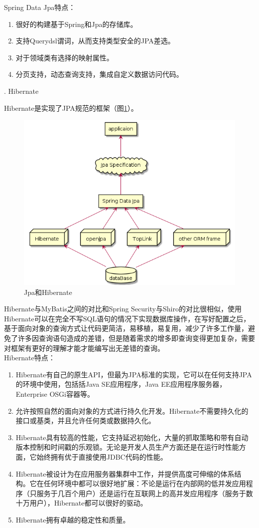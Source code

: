 Spring Data Jpa特点：
\begin{enumerate}
  \item 很好的构建基于Spring和Jpa的存储库。
  \item 支持Querydsl谓词，从而支持类型安全的JPA差选。
  \item 对于领域类有选择的映射属性。
  \item 分页支持，动态查询支持，集成自定义数据访问代码。
\end{enumerate}

. Hibernate

Hibernate是实现了JPA规范的框架（图\ref{JpaAndHibernate}）。
\begin{figure}[htbp]
  \centering
  \includegraphics[scale = 0.5]{out/uml/部署图/Jpa和Hibernate/Jpa和Hibernate.png}
  \caption{\song\wuhao Jpa和Hibernate}
  \label{JpaAndHibernate}
\end{figure} Hibernate与MyBatis之间的对比和Spring Security与Shiro的对比很相似，使用Hibernate可以在完全不写SQL语句的情况下实现数据库操作，在写好配置之后，基于面向对象的查询方式让代码更简洁，易移植，易复用，减少了许多工作量，避免了许多因查询语句造成的差错，但是随着需求的增多即查询变得更加复杂，需要对框架有更好的理解才能才能编写出无差错的查询。\\
Hibernate特点：
\begin{enumerate}
  \item Hibernate有自己的原生API，但最为JPA标准的实现，它可以在任何支持JPA的环境中使用，包括括Java SE应用程序，Java EE应用程序服务器，Enterprise OSGi容器等。
  \item 允许按照自然的面向对象的方式进行持久化开发。Hibernate不需要持久化的接口或基类，并且允许任何类或数据持久化。
  \item Hibernate具有较高的性能，它支持延迟初始化，大量的抓取策略和带有自动版本控制和时间戳的乐观锁。无论是开发人员生产方面还是在运行时性能方面，它始终拥有优于直接使用JDBC代码的性能。
  \item Hibernate被设计为在应用服务器集群中工作，并提供高度可伸缩的体系结构。它在任何环境中都可以很好地扩展：不论是运行在内部网的低并发应用程序（只服务于几百个用户）还是运行在互联网上的高并发应用程序（服务于数十万用户），Hibernate都可以很好的驱动。
  \item Hibernate拥有卓越的稳定性和质量。
\end{enumerate}
